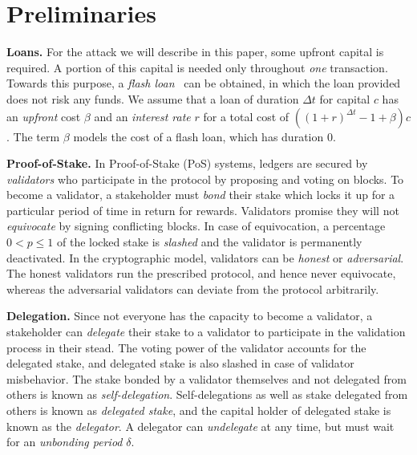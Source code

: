 \section{Preliminaries}\label{sec:preliminaries}


\noindent
\textbf{Loans.} For the attack we will describe in this paper, some upfront
capital is required. A portion of this capital is needed only throughout \emph{one}
transaction. Towards this purpose, a \emph{flash loan}~\cite{gudgeon2020defi} can
be obtained, in which the loan provided does not risk any funds. We assume that
a loan of duration $\Delta t$ for capital $c$ has an \emph{upfront} cost $\beta$
and an \emph{interest rate} $r$ for a total cost of
$((1 + r)^{\Delta t} - 1 + \beta) c$. The term $\beta$ models the cost of a flash loan,
which has duration $0$.

\noindent
\textbf{Proof-of-Stake.} In Proof-of-Stake (PoS) systems, ledgers are secured
by \emph{validators} who participate in the protocol by proposing and voting
on blocks. To become a validator, a stakeholder must \emph{bond} their stake
which locks it up for a particular period of time in return for rewards.
Validators promise they will
not \emph{equivocate} by signing conflicting blocks.
In case of equivocation, a percentage $0 < p \leq 1$ of the locked stake is
\emph{slashed} and the validator is permanently deactivated. In the cryptographic
model, validators can be \emph{honest} or \emph{adversarial}. The honest validators
run the prescribed protocol, and hence never equivocate, whereas the adversarial
validators can deviate from the protocol arbitrarily.


\noindent
\textbf{Delegation.} Since not everyone has the capacity to become a validator,
a stakeholder can \emph{delegate} their stake to a validator to participate in
the validation process in their stead. The voting power of the validator accounts
for the delegated stake, and delegated stake is also slashed in case of validator
misbehavior. The stake bonded by a validator themselves and not delegated from
others is known as \emph{self-delegation}. Self-delegations as
well as stake delegated from others is known as \emph{delegated stake},
and the capital holder of delegated stake is known as the \emph{delegator}.
A delegator can \emph{undelegate} at any time, but must wait for an
\emph{unbonding period} $\delta$.

